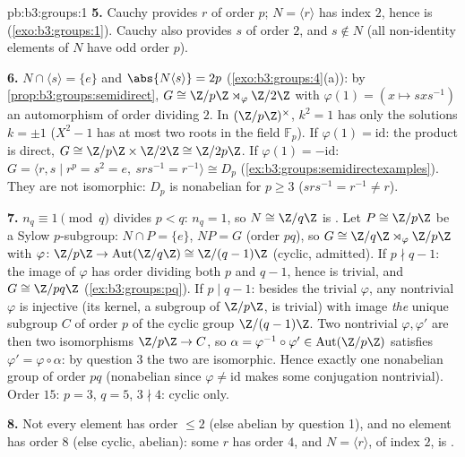 \begin{solution}{pb:b3:groups:1}
\textbf{5.} Cauchy provides $r$ of order $p$; $N = \langle r
\rangle$ has index $2$, hence is  (\cref{exo:b3:groups:1}).
Cauchy also provides $s$ of order $2$, and $s \notin N$ (all
non-identity elements of $N$ have odd order $p$).

\textbf{6.} $N \cap \langle s \rangle = \{e\}$ and $\abs{N\langle
s\rangle} = 2p$ (\cref{exo:b3:groups:4}(a)): by
\cref{prop:b3:groups:semidirect}, $G \cong \Z/p\Z \rtimes_\varphi
\Z/2\Z$ with $\varphi(1) = (x \mapsto sxs^{-1})$ an automorphism
of order dividing $2$. In $(\Z/p\Z)^\times$, $k^2 = 1$ has only
the solutions $k = \pm 1$ ($X^2 - 1$ has at most two roots in the
field $\mathbb F_p$). If $\varphi(1) = \mathrm{id}$: the product
is direct, $G \cong \Z/p\Z \times \Z/2\Z \cong \Z/2p\Z$. If
$\varphi(1) = -\mathrm{id}$: $G = \langle r, s \mid r^p = s^2 = e,
\ srs^{-1} = r^{-1}\rangle \cong D_p$
(\cref{ex:b3:groups:semidirectexamples}). They are not isomorphic:
$D_p$ is nonabelian for $p \geq 3$ ($srs^{-1} = r^{-1} \neq r$).

\textbf{7.} $n_q \equiv 1 \pmod q$ divides $p < q$: $n_q = 1$, so
$N \cong \Z/q\Z$ is . Let $P \cong \Z/p\Z$ be a Sylow
$p$-subgroup: $N \cap P = \{e\}$, $NP = G$ (order $pq$), so $G
\cong \Z/q\Z \rtimes_\varphi \Z/p\Z$ with $\varphi \colon \Z/p\Z
\to \operatorname{Aut}(\Z/q\Z) \cong \Z/(q-1)\Z$ (cyclic,
admitted). If $p \nmid q - 1$: the image of $\varphi$ has order
dividing both $p$ and $q-1$, hence is trivial, and $G \cong
\Z/pq\Z$ (\cref{ex:b3:groups:pq}). If $p \mid q - 1$: besides the
trivial $\varphi$, any nontrivial $\varphi$ is injective (its
kernel, a subgroup of $\Z/p\Z$, is trivial) with image \emph{the}
unique subgroup $C$ of order $p$ of the cyclic group
$\Z/(q-1)\Z$. Two nontrivial  $\varphi, \varphi'$ are then
two isomorphisms $\Z/p\Z \to C$, so $\alpha =
\varphi^{-1}\circ\varphi' \in \operatorname{Aut}(\Z/p\Z)$
satisfies $\varphi' = \varphi\circ\alpha$: by question 3 the two
 are isomorphic. Hence exactly one nonabelian
group of order $pq$ (nonabelian since $\varphi \neq
\mathrm{id}$ makes some conjugation nontrivial). Order $15$: $p =
3$, $q = 5$, $3 \nmid 4$: cyclic only.

\textbf{8.} Not every element has order $\leq 2$ (else abelian by
question 1), and no element has order $8$ (else cyclic, abelian):
some $r$ has order $4$, and $N = \langle r\rangle$, of index $2$,
is .


\end{solution}
